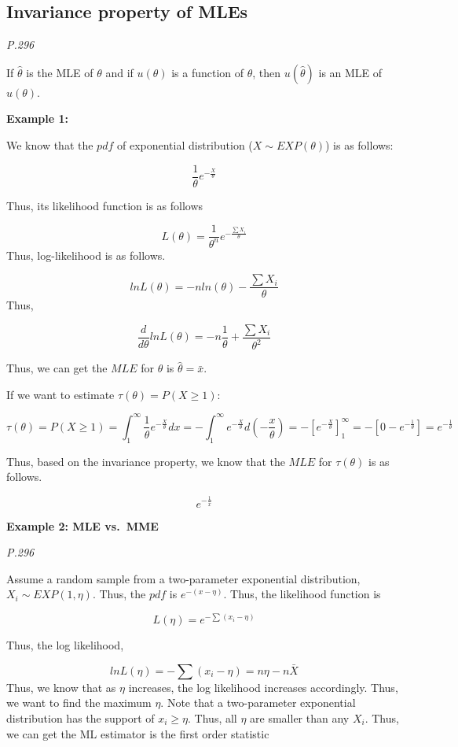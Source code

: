 \documentclass[]{book}
\begin{document}
\hypertarget{invariance-property-of-mles}{%
\subsection{Invariance property of MLEs}\label{invariance-property-of-mles}}

\emph{P.296}

If \(\hat{\theta}\) is the MLE of \(\theta\) and if \(u(\theta)\) is a function of \(\theta\), then \(u(\hat{\theta})\) is an MLE of \(u(\theta)\).

\textbf{Example 1:}

We know that the \(pdf\) of exponential distribution (\(X \sim EXP (\theta)\)) is as follows:

\[\frac{1}{\theta} e^{-\frac{X}{\theta}}\]

Thus, its likelihood function is as follows

\[L(\theta)=\frac{1}{\theta^n}e^{-\frac{\sum X_i}{\theta}}\]
Thus, log-likelihood is as follows.

\[lnL(\theta)=-n ln(\theta)-\frac{\sum X_i}{\theta}\]
Thus,

\[\frac{d}{d\theta} lnL(\theta)=-n \frac{1}{\theta}+\frac{\sum X_i}{\theta^2}\]

Thus, we can get the \(MLE\) for \(\theta\) is \(\hat{\theta}=\bar{x}\).

If we want to estimate \(\tau(\theta)=P(X \geq 1)\):

\[\tau(\theta)=P(X\geq 1)=\int_1^{\infty} \frac{1}{\theta} e^{-\frac{X}{\theta}} dx=-\int_1^{\infty}  e^{-\frac{X}{\theta}} d(-\frac{x}{\theta})=-[e^{-\frac{X}{\theta}}]_1^{\infty}=-[0-e^{-\frac{1}{\theta}}]=e^{-\frac{1}{\theta}}\]

Thus, based on the invariance property, we know that the \(MLE\) for \(\tau(\theta)\) is as follows.

\[e^{-\frac{1}{\bar{x}}}\]

\textbf{Example 2: MLE vs.~MME}

\emph{P.296}

Assume a random sample from a two-parameter exponential distribution, \(X_i \sim EXP(1,\eta)\). Thus, the \(pdf\) is \(e^{-(x-\eta)}\). Thus, the likelihood function is

\[L(\eta)=e^{-\sum(x_i-\eta)}\]

Thus, the log likelihood,

\[lnL(\eta)=-\sum(x_i-\eta)=n\eta-n\bar{X}\]
Thus, we know that as \(\eta\) increases, the log likelihood increases accordingly. Thus, we want to find the maximum \(\eta\). Note that a two-parameter exponential distribution has the support of \(x_i \geq \eta\). Thus, all \(\eta\) are smaller than any \(X_i\). Thus, we can get the ML estimator is the first order statistic
\end{document}
